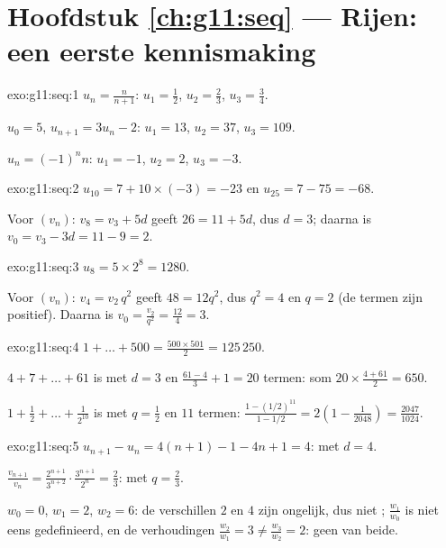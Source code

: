 \section*{Hoofdstuk \ref{ch:g11:seq} --- Rijen: een eerste kennismaking}

\begin{solution}{exo:g11:seq:1}
$u_n = \frac{n}{n+1}$: $u_1 = \frac12$, $u_2 = \frac23$, $u_3 = \frac34$.

$u_0 = 5$, $u_{n+1} = 3u_n - 2$: $u_1 = 13$, $u_2 = 37$, $u_3 = 109$.

$u_n = (-1)^n n$: $u_1 = -1$, $u_2 = 2$, $u_3 = -3$.
\end{solution}

\begin{solution}{exo:g11:seq:2}
$u_{10} = 7 + 10 \times (-3) = -23$ en $u_{25} = 7 - 75 = -68$.

Voor $(v_n)$: $v_8 = v_3 + 5d$ geeft $26 = 11 + 5d$, dus $d = 3$; daarna is
$v_0 = v_3 - 3d = 11 - 9 = 2$.
\end{solution}

\begin{solution}{exo:g11:seq:3}
$u_8 = 5 \times 2^8 = 1280$.

Voor $(v_n)$: $v_4 = v_2\, q^2$ geeft $48 = 12 q^2$, dus $q^2 = 4$ en
$q = 2$ (de termen zijn positief). Daarna is
$v_0 = \frac{v_2}{q^2} = \frac{12}{4} = 3$.
\end{solution}

\begin{solution}{exo:g11:seq:4}
$1 + \dots + 500 = \frac{500 \times 501}{2} = 125\,250$.

$4 + 7 + \dots + 61$ is  met $d = 3$ en
$\frac{61 - 4}{3} + 1 = 20$ termen: som $20 \times \frac{4 + 61}{2} = 650$.

$1 + \frac12 + \dots + \frac{1}{2^{10}}$ is  met $q = \frac12$ en
$11$ termen:
$\frac{1 - (1/2)^{11}}{1 - 1/2} = 2\left(1 - \frac{1}{2048}\right)
= \frac{2047}{1024}$.
\end{solution}

\begin{solution}{exo:g11:seq:5}
$u_{n+1} - u_n = 4(n+1) - 1 - 4n + 1 = 4$:  met $d = 4$.

$\frac{v_{n+1}}{v_n} = \frac{2^{n+1}}{3^{n+2}} \cdot \frac{3^{n+1}}{2^n}
= \frac23$:  met $q = \frac23$.

$w_0 = 0$, $w_1 = 2$, $w_2 = 6$: de verschillen $2$ en $4$ zijn ongelijk, dus
niet ; $\frac{w_1}{w_0}$ is niet eens gedefinieerd, en de
verhoudingen $\frac{w_2}{w_1} = 3 \neq \frac{w_3}{w_2} = 2$: geen van beide.
\end{solution}

